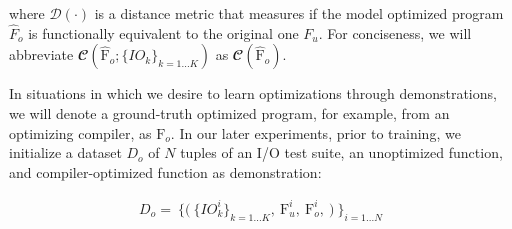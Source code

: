\documentclass{article}
\begin{document}


where $\mathcal{D}(\cdot)$ is a distance metric that measures if the model optimized program $\hat{F}_o$ is functionally equivalent to the original one $F_u$. For conciseness, we will abbreviate $\mathbfcal{C} (\hat{\textrm{F}}_{o}; \{IO_k\}_{k=1...K})$  as $\mathbfcal{C} (\hat{\textrm{F}}_{o})$. 

In situations in which we desire to learn optimizations through demonstrations, we will denote a ground-truth optimized program, for example, from an optimizing compiler, as $\textrm{F}_o$. In our later experiments, prior to training, we initialize a dataset $D_o$ of $N$ tuples of an I/O test suite, an unoptimized function, and compiler-optimized function as demonstration: 

\begin{equation} 
    \begin{split}
    \label{eqn:init_dataset}
        D_o = \
                \bigg\{
                    \Big( \
                        \{IO_k^i\}_{k=1...K}, \
                        \textrm{F}_{u}^i, \
                        \textrm{F}_{o}^i, \
                    \Big) \
                \bigg\}_{i = 1...N} \\
    \end{split}
\end{equation}
\end{document}
